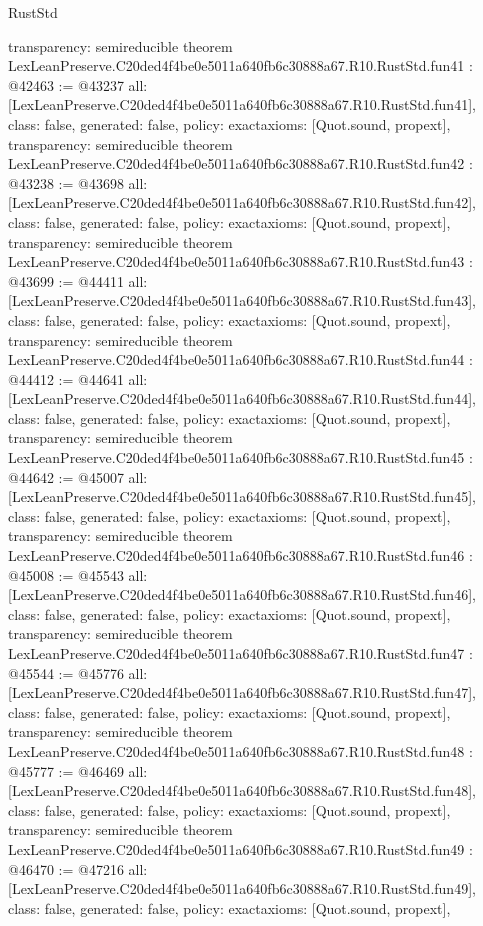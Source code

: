 \begin{lexlean}{RustStd}
\begin{coremodule}
{  transparency: semireducible
}
theorem LexLeanPreserve.C20ded4f4be0e5011a640fb6c30888a67.R10.RustStd.fun41 : @42463 := @43237 {
  all: [LexLeanPreserve.C20ded4f4be0e5011a640fb6c30888a67.R10.RustStd.fun41],
  class: false,
  generated: false,
  policy: exact{axioms: [Quot.sound, propext]},
  transparency: semireducible
}
theorem LexLeanPreserve.C20ded4f4be0e5011a640fb6c30888a67.R10.RustStd.fun42 : @43238 := @43698 {
  all: [LexLeanPreserve.C20ded4f4be0e5011a640fb6c30888a67.R10.RustStd.fun42],
  class: false,
  generated: false,
  policy: exact{axioms: [Quot.sound, propext]},
  transparency: semireducible
}
theorem LexLeanPreserve.C20ded4f4be0e5011a640fb6c30888a67.R10.RustStd.fun43 : @43699 := @44411 {
  all: [LexLeanPreserve.C20ded4f4be0e5011a640fb6c30888a67.R10.RustStd.fun43],
  class: false,
  generated: false,
  policy: exact{axioms: [Quot.sound, propext]},
  transparency: semireducible
}
theorem LexLeanPreserve.C20ded4f4be0e5011a640fb6c30888a67.R10.RustStd.fun44 : @44412 := @44641 {
  all: [LexLeanPreserve.C20ded4f4be0e5011a640fb6c30888a67.R10.RustStd.fun44],
  class: false,
  generated: false,
  policy: exact{axioms: [Quot.sound, propext]},
  transparency: semireducible
}
theorem LexLeanPreserve.C20ded4f4be0e5011a640fb6c30888a67.R10.RustStd.fun45 : @44642 := @45007 {
  all: [LexLeanPreserve.C20ded4f4be0e5011a640fb6c30888a67.R10.RustStd.fun45],
  class: false,
  generated: false,
  policy: exact{axioms: [Quot.sound, propext]},
  transparency: semireducible
}
theorem LexLeanPreserve.C20ded4f4be0e5011a640fb6c30888a67.R10.RustStd.fun46 : @45008 := @45543 {
  all: [LexLeanPreserve.C20ded4f4be0e5011a640fb6c30888a67.R10.RustStd.fun46],
  class: false,
  generated: false,
  policy: exact{axioms: [Quot.sound, propext]},
  transparency: semireducible
}
theorem LexLeanPreserve.C20ded4f4be0e5011a640fb6c30888a67.R10.RustStd.fun47 : @45544 := @45776 {
  all: [LexLeanPreserve.C20ded4f4be0e5011a640fb6c30888a67.R10.RustStd.fun47],
  class: false,
  generated: false,
  policy: exact{axioms: [Quot.sound, propext]},
  transparency: semireducible
}
theorem LexLeanPreserve.C20ded4f4be0e5011a640fb6c30888a67.R10.RustStd.fun48 : @45777 := @46469 {
  all: [LexLeanPreserve.C20ded4f4be0e5011a640fb6c30888a67.R10.RustStd.fun48],
  class: false,
  generated: false,
  policy: exact{axioms: [Quot.sound, propext]},
  transparency: semireducible
}
theorem LexLeanPreserve.C20ded4f4be0e5011a640fb6c30888a67.R10.RustStd.fun49 : @46470 := @47216 {
  all: [LexLeanPreserve.C20ded4f4be0e5011a640fb6c30888a67.R10.RustStd.fun49],
  class: false,
  generated: false,
  policy: exact{axioms: [Quot.sound, propext]},
}
\end{coremodule}
\end{lexlean}

